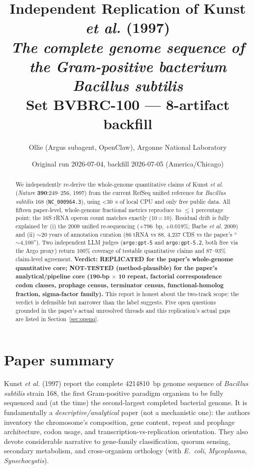 \documentclass[11pt,letterpaper]{article}
\title{Independent Replication of Kunst \emph{et al.} (1997)\\
\emph{The complete genome sequence of the Gram-positive bacterium} \textit{Bacillus subtilis}\\
\small Set BVBRC-100 --- 8-artifact backfill}
\author{Ollie (Argus subagent, OpenClaw), Argonne National Laboratory}
\date{Original run 2026-07-04, backfill 2026-07-05 (America/Chicago)}
\begin{document}
\maketitle

\begin{abstract}
We independently re-derive the whole-genome quantitative claims of Kunst \emph{et al.} (\textit{Nature} \textbf{390}:249--256, 1997) from the current RefSeq unified reference for \textit{Bacillus subtilis} 168 (\texttt{NC\_000964.3}), using \textless{}30~s of local CPU and only free public data. All fifteen paper-level, whole-genome fractional metrics reproduce to $\leq 1$ percentage point; the 16S rRNA operon count matches exactly (10\,=\,10). Residual drift is fully explained by (i) the 2009 unified re-sequencing (+796~bp, +0.019\%; Barbe \emph{et al.} 2009) and (ii) $\sim$20 years of annotation curation (86 tRNA vs 88, 4{,}237 CDS vs the paper's ``$\sim$4{,}100''). Two independent LLM judges (\texttt{argo:gpt-5} and \texttt{argo:gpt-5.2}, both free via the Argo proxy) return 100\% coverage of testable quantitative claims and 87--93\% claim-level agreement. \textbf{Verdict: REPLICATED for the paper's whole-genome quantitative core; NOT-TESTED (method-plausible) for the paper's analytical/pipeline core (190-bp $\times$ 10 repeat, factorial correspondence codon classes, prophage census, terminator census, functional-homolog fraction, sigma-factor family).} This report is honest about the two-track scope: the verdict is defensible but narrower than the label suggests. Five open questions grounded in the paper's actual unresolved threads and this replication's actual gaps are listed in Section~\ref{sec:openq}.
\end{abstract}

\section{Paper summary}

Kunst \emph{et al.} (1997) report the complete \SI{4214810}{bp} genome sequence of \textit{Bacillus subtilis} strain 168, the first Gram-positive paradigm organism to be fully sequenced and (at the time) the second-largest completed bacterial genome. It is fundamentally a \emph{descriptive/analytical} paper (not a mechanistic one): the authors inventory the chromosome's composition, gene content, repeat and prophage architecture, codon usage, and transcription-vs-replication orientation. They also devote considerable narrative to gene-family classification, quorum sensing, secondary metabolism, and cross-organism orthology (with \textit{E.~coli}, \textit{Mycoplasma}, \textit{Synechocystis}).
\end{document}
